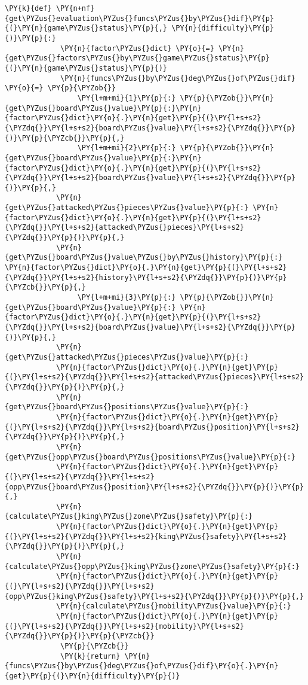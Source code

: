 \begin{Verbatim}[commandchars=\\\{\}]
         \PY{k}{def} \PY{n+nf}{get\PYZus{}evaluation\PYZus{}funcs\PYZus{}by\PYZus{}dif}\PY{p}{(}\PY{n}{game\PYZus{}status}\PY{p}{,} \PY{n}{difficulty}\PY{p}{)}\PY{p}{:}
             \PY{n}{factor\PYZus{}dict} \PY{o}{=} \PY{n}{get\PYZus{}factors\PYZus{}by\PYZus{}game\PYZus{}status}\PY{p}{(}\PY{n}{game\PYZus{}status}\PY{p}{)}
             \PY{n}{funcs\PYZus{}by\PYZus{}deg\PYZus{}of\PYZus{}dif} \PY{o}{=} \PY{p}{\PYZob{}}
                 \PY{l+m+mi}{1}\PY{p}{:} \PY{p}{\PYZob{}}\PY{n}{get\PYZus{}board\PYZus{}value}\PY{p}{:}\PY{n}{factor\PYZus{}dict}\PY{o}{.}\PY{n}{get}\PY{p}{(}\PY{l+s+s2}{\PYZdq{}}\PY{l+s+s2}{board\PYZus{}value}\PY{l+s+s2}{\PYZdq{}}\PY{p}{)}\PY{p}{\PYZcb{}}\PY{p}{,}
                 \PY{l+m+mi}{2}\PY{p}{:} \PY{p}{\PYZob{}}\PY{n}{get\PYZus{}board\PYZus{}value}\PY{p}{:}\PY{n}{factor\PYZus{}dict}\PY{o}{.}\PY{n}{get}\PY{p}{(}\PY{l+s+s2}{\PYZdq{}}\PY{l+s+s2}{board\PYZus{}value}\PY{l+s+s2}{\PYZdq{}}\PY{p}{)}\PY{p}{,} 
			\PY{n}{get\PYZus{}attacked\PYZus{}pieces\PYZus{}value}\PY{p}{:} \PY{n}{factor\PYZus{}dict}\PY{o}{.}\PY{n}{get}\PY{p}{(}\PY{l+s+s2}{\PYZdq{}}\PY{l+s+s2}{attacked\PYZus{}pieces}\PY{l+s+s2}{\PYZdq{}}\PY{p}{)}\PY{p}{,} 
			\PY{n}{get\PYZus{}board\PYZus{}value\PYZus{}by\PYZus{}history}\PY{p}{:} \PY{n}{factor\PYZus{}dict}\PY{o}{.}\PY{n}{get}\PY{p}{(}\PY{l+s+s2}{\PYZdq{}}\PY{l+s+s2}{history}\PY{l+s+s2}{\PYZdq{}}\PY{p}{)}\PY{p}{\PYZcb{}}\PY{p}{,}
                 \PY{l+m+mi}{3}\PY{p}{:} \PY{p}{\PYZob{}}\PY{n}{get\PYZus{}board\PYZus{}value}\PY{p}{:} \PY{n}{factor\PYZus{}dict}\PY{o}{.}\PY{n}{get}\PY{p}{(}\PY{l+s+s2}{\PYZdq{}}\PY{l+s+s2}{board\PYZus{}value}\PY{l+s+s2}{\PYZdq{}}\PY{p}{)}\PY{p}{,} 
			\PY{n}{get\PYZus{}attacked\PYZus{}pieces\PYZus{}value}\PY{p}{:} 
			\PY{n}{factor\PYZus{}dict}\PY{o}{.}\PY{n}{get}\PY{p}{(}\PY{l+s+s2}{\PYZdq{}}\PY{l+s+s2}{attacked\PYZus{}pieces}\PY{l+s+s2}{\PYZdq{}}\PY{p}{)}\PY{p}{,} 
			\PY{n}{get\PYZus{}board\PYZus{}positions\PYZus{}value}\PY{p}{:} 
			\PY{n}{factor\PYZus{}dict}\PY{o}{.}\PY{n}{get}\PY{p}{(}\PY{l+s+s2}{\PYZdq{}}\PY{l+s+s2}{board\PYZus{}position}\PY{l+s+s2}{\PYZdq{}}\PY{p}{)}\PY{p}{,} 
			\PY{n}{get\PYZus{}opp\PYZus{}board\PYZus{}positions\PYZus{}value}\PY{p}{:} 
			\PY{n}{factor\PYZus{}dict}\PY{o}{.}\PY{n}{get}\PY{p}{(}\PY{l+s+s2}{\PYZdq{}}\PY{l+s+s2}{opp\PYZus{}board\PYZus{}position}\PY{l+s+s2}{\PYZdq{}}\PY{p}{)}\PY{p}{,} 
			\PY{n}{calculate\PYZus{}king\PYZus{}zone\PYZus{}safety}\PY{p}{:} 
			\PY{n}{factor\PYZus{}dict}\PY{o}{.}\PY{n}{get}\PY{p}{(}\PY{l+s+s2}{\PYZdq{}}\PY{l+s+s2}{king\PYZus{}safety}\PY{l+s+s2}{\PYZdq{}}\PY{p}{)}\PY{p}{,} 
			\PY{n}{calculate\PYZus{}opp\PYZus{}king\PYZus{}zone\PYZus{}safety}\PY{p}{:} 
			\PY{n}{factor\PYZus{}dict}\PY{o}{.}\PY{n}{get}\PY{p}{(}\PY{l+s+s2}{\PYZdq{}}\PY{l+s+s2}{opp\PYZus{}king\PYZus{}safety}\PY{l+s+s2}{\PYZdq{}}\PY{p}{)}\PY{p}{,} 
			\PY{n}{calculate\PYZus{}mobility\PYZus{}value}\PY{p}{:} 
			\PY{n}{factor\PYZus{}dict}\PY{o}{.}\PY{n}{get}\PY{p}{(}\PY{l+s+s2}{\PYZdq{}}\PY{l+s+s2}{mobility}\PY{l+s+s2}{\PYZdq{}}\PY{p}{)}\PY{p}{\PYZcb{}}
             \PY{p}{\PYZcb{}}
             \PY{k}{return} \PY{n}{funcs\PYZus{}by\PYZus{}deg\PYZus{}of\PYZus{}dif}\PY{o}{.}\PY{n}{get}\PY{p}{(}\PY{n}{difficulty}\PY{p}{)}
         

\end{Verbatim}
